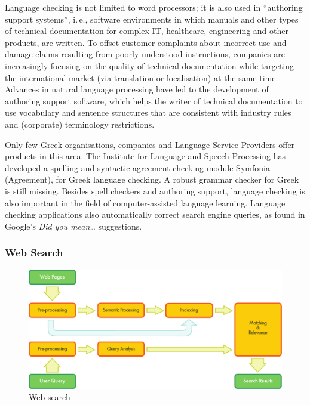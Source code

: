 \begin{multicols}{2}

Language checking is not limited to word processors; it is also used in “authoring support systems”, i.\,e., software environments in which manuals and other types of technical documentation for complex IT, healthcare, engineering and other products, are written. To offset customer complaints about incorrect use and damage claims resulting from poorly understood instructions, companies are increasingly focusing on the quality of technical documentation while targeting the international market (via translation or localisation) at the same time. Advances in natural language processing have led to the development of authoring support software, which helps the writer of technical documentation to use vocabulary and sentence structures that are consistent with industry rules and (corporate) terminology restrictions.

Only few Greek organisations, companies and Language Service Providers offer products in this area. The Institute for Language and Speech Processing has developed a spelling and syntactic agreement checking module Symfonia (Agreement), for Greek language checking. A robust grammar checker for Greek is still missing.
Besides spell checkers and authoring support, language checking is also important in the field of computer-assisted language learning. Language checking applications also automatically correct search engine queries, as found in Google's \textit{Did you mean…} suggestions.

\subsubsection{Web Search}

\begin{figure}[htb]
  \center
  \includegraphics[width=\textwidth]{../_media/english/web_search_architecture}
  \caption{Web search}
\label{fig:websearcharch_en}
 \end{figure}


\end{multicols}
